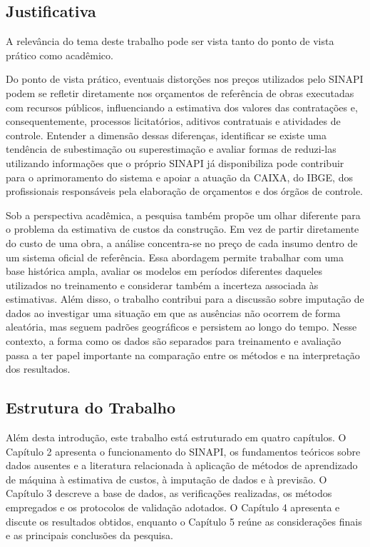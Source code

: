 \subsection{Justificativa}

A relevância do tema deste trabalho pode ser vista tanto do ponto de vista prático como 
acadêmico.

Do ponto de vista prático, eventuais distorções nos preços utilizados pelo SINAPI podem 
se refletir diretamente nos orçamentos de referência de obras executadas com recursos 
públicos, influenciando a estimativa dos valores das contratações e, consequentemente, 
processos licitatórios, aditivos contratuais e atividades de controle. Entender a 
dimensão dessas diferenças, identificar se existe uma tendência de subestimação ou 
superestimação e avaliar formas de reduzi-las utilizando informações que o próprio 
SINAPI já disponibiliza pode contribuir para o aprimoramento do sistema e apoiar a 
atuação da CAIXA, do IBGE, dos profissionais responsáveis pela elaboração de orçamentos 
e dos órgãos de controle.

Sob a perspectiva acadêmica, a pesquisa também propõe um olhar diferente para o problema 
da estimativa de custos da construção. Em vez de partir diretamente do custo de uma 
obra, a análise concentra-se no preço de cada insumo dentro de um sistema oficial de 
referência. Essa abordagem permite trabalhar com uma base histórica ampla, avaliar os 
modelos em períodos diferentes daqueles utilizados no treinamento e considerar também a 
incerteza associada às estimativas. Além disso, o trabalho contribui para a discussão 
sobre imputação de dados ao investigar uma situação em que as ausências não ocorrem de 
forma aleatória, mas seguem padrões geográficos e persistem ao longo do tempo. Nesse 
contexto, a forma como os dados são separados para treinamento e avaliação passa a ter 
papel importante na comparação entre os métodos e na interpretação dos resultados.

\subsection{Estrutura do Trabalho}

Além desta introdução, este trabalho está estruturado em quatro capítulos. 
O Capítulo 2 apresenta o funcionamento do SINAPI, os fundamentos teóricos sobre dados 
ausentes e a literatura relacionada à aplicação de métodos de aprendizado de máquina à 
estimativa de custos, à imputação de dados e à previsão. O Capítulo 3 descreve a base de 
dados, as verificações realizadas, os métodos empregados e os protocolos de validação 
adotados. O Capítulo 4 apresenta e discute os resultados obtidos, enquanto o Capítulo 5 
reúne as considerações finais e as principais conclusões da pesquisa.